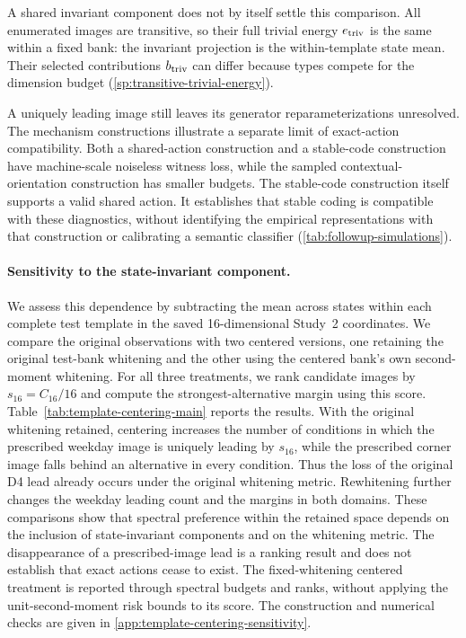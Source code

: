 A shared invariant component does not by itself settle this comparison. All enumerated images are transitive, so their full trivial energy $e_{\rm triv}$ is the same within a fixed bank: the invariant projection is the within-template state mean. Their selected contributions $b_{\rm triv}$ can differ because types compete for the dimension budget (\cref{sp:transitive-trivial-energy}).

A uniquely leading image still leaves its generator reparameterizations unresolved. The mechanism constructions illustrate a separate limit of exact-action compatibility. Both a shared-action construction and a stable-code construction have machine-scale noiseless witness loss, while the sampled contextual-orientation construction has smaller budgets. The stable-code construction itself supports a valid shared action. It establishes that stable coding is compatible with these diagnostics, without identifying the empirical representations with that construction or calibrating a semantic classifier (\cref{tab:followup-simulations}).

\paragraph{Sensitivity to the state-invariant component.}
We assess this dependence by subtracting the mean across states
within each complete test template in the saved 16-dimensional
Study~2 coordinates.
We compare the original observations with two centered versions,
one retaining the original test-bank whitening and the other
using the centered bank's own second-moment whitening.
For all three treatments, we rank candidate images by
$s_{16}=C_{16}/16$ and compute the strongest-alternative margin
using this score.
Table~\ref{tab:template-centering-main} reports the results.
With the original whitening retained, centering increases the
number of conditions in which the prescribed weekday image
is uniquely leading by $s_{16}$, while the prescribed corner
image falls behind an alternative in every condition.
Thus the loss of the original D4 lead already occurs under the
original whitening metric.
Rewhitening further changes the weekday leading count and the
margins in both domains.
These comparisons show that spectral preference within the
retained space depends on the inclusion of state-invariant
components and on the whitening metric.
The disappearance of a prescribed-image lead is a ranking
result and does not establish that exact actions cease to exist.
The fixed-whitening centered treatment is reported through
spectral budgets and ranks, without applying the
unit-second-moment risk bounds to its score.
The construction and numerical checks are given in
\cref{app:template-centering-sensitivity}.

